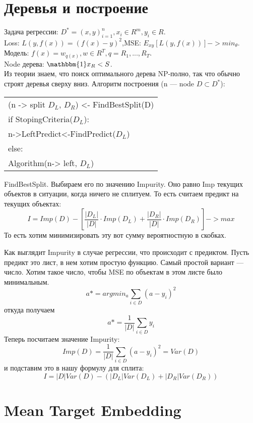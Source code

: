 \section{Деревья и построение}

Задача регрессии: $D^* = {(x, y)}^n_{i=1}, x_i \in R^m, y_i \in R$.\\

Loss: $L(y, f(x)) = (f(x)-y)^2$,\quad \quad \quad MSE: $E_{xy}[L(y, f(x))] -> min_\theta$.\\

Модель: $f(x) = w_{q(x)}, w \in R^T, q={R_1, ..., R_T}$.\\

Node дерева: $\mathbbm{1}x_R < S$.\\

Из теории знаем, что поиск оптимального дерева NP-полно, так что обычно строят деревья сверху вниз. Алгоритм построения (n --- node $D\subset D^*$):

\begin{center}
\begin{tabular}{l}
(n -> split $D_L$, $D_R$) <- FindBestSplit(D)\\
if StopingCriteria($D_L$):\\
\quad n->LeftPredict<-FindPredict($D_L$)\\
else:\\
\quad Algorithm(n-> left, $D_L$)\\
\end{tabular}
\end{center}

FindBestSplit. Выбираем его по значению Impurity. Оно равно Imp текущих объектов в ситуации, когда ничего не сплитуем. То есть считаем предикт на текущих объектах:
$$I = Imp(D) - [\frac{|D_L|}{|D|} \cdot Imp(D_L) + \frac{|D_R|}{|D|} \cdot Imp(D_R)] -> max$$
То есть хотим минимизировать эту вот сумму вероятностную в скобках.

Как выглядит Impurity в случае регрессии, что происходит с предиктом. Пусть предикт это лист, в нем хотим простую функцию. Самый простой вариант --- число. Хотим такое число, чтобы MSE по объектам в этом листе было минимальным.
$$a* = argmin_a {\sum_{i \in D} {(a-y_i)^2}}$$
откуда получаем
$$a*=\frac{1}{|D|}\sum_{i \in D} {y_i}$$
Теперь посчитаем значение Impurity:
$$Imp(D) = \frac{1}{|D|} \sum_{i \in D} {(a-y_i)^2} = Var(D)$$
и подставим это в нашу формулу для сплита:
$$I = |D|Var(D) - (|D_L|Var(D_L) + |D_R|Var(D_R))$$

\section{Mean Target Embedding}

